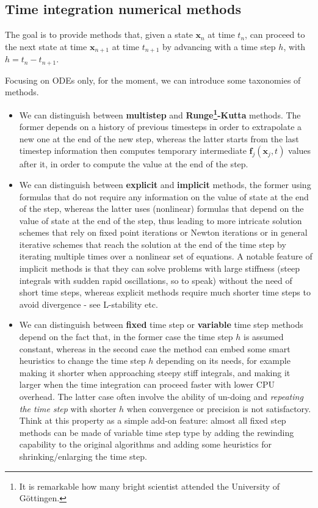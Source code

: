 \documentclass{digitaldynamics}
\def\vect#1{\bm{#1}}
\begin{document}
\subsection{Time integration numerical methods}

The goal is to provide methods that, given a state $\vect{x}_n$ at time $t_{n}$, can proceed to the next state at time $\vect{x}_{n+1}$ at time $t_{n+1}$ by advancing with a time step $h$, with $h=t_{n}-t_{n+1}$.

Focusing on ODEs only, for the moment, we can introduce some taxonomies of methods.

\begin{itemize}

\item
We can distinguish between \textbf{multistep} and \textbf{Runge\footnote{It is remarkable how many bright scientist attended the University of Göttingen.}-Kutta} methods.
The former depends on a history of previous timesteps in order to extrapolate a new one at the end of the new step, whereas the latter starts from the last timestep information then computes temporary intermediate $\vect{f}_j \left( \vect{x}_j, t\right)$ values after it, in order to compute the value at the end of the step.

\item
We can distinguish between \textbf{explicit} and \textbf{implicit} methods, the former using formulas that do not require any information on the value of state at the end of the step, whereas the latter uses (nonlinear) formulas that depend on the value of state at the end of the step, thus leading to more intricate solution schemes that rely on fixed point iterations or Newton iterations or in general iterative schemes that reach the solution at the end of the time step by iterating multiple times over a nonlinear set of equations. 
A notable feature of implicit methods is that they can solve problems with large stiffness (steep integrals with sudden rapid oscillations, so to speak) without the need of short time steps, whereas explicit methods require much shorter time steps to avoid divergence - see L-stability etc.

\item
We can distinguish between \textbf{fixed} time step or \textbf{variable} time step methods depend on the fact that, in the former case the time step $h$ is assumed constant, whereas in the second case the method can embed some smart heuristics to change the time step $h$ depending on its needs, for example making it shorter when approaching steepy stiff integrals, and making it larger when the time integration can proceed faster with lower CPU overhead. The latter case often involve the ability of un-doing and \textit{repeating the time step} with shorter $h$ when convergence or precision is not satisfactory. 
Think at this property as a simple add-on feature: almost all fixed step methods can be made of variable time step type by adding the rewinding capability to the original algorithms and adding some heuristics for shrinking/enlarging the time step.


\end{itemize}
\end{document}
